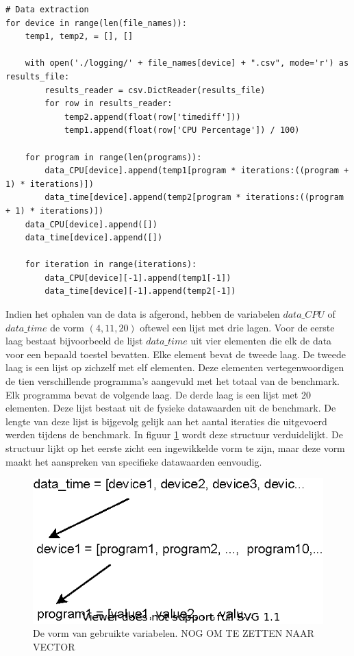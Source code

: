  	\newpage
 
	\begin{lstlisting}[caption={Ophalen data uit bestand voor elk toestel.},captionpos=b, label = {lst:extractiedata}]
# Data extraction
for device in range(len(file_names)):
	temp1, temp2, = [], []
	
	with open('./logging/' + file_names[device] + ".csv", mode='r') as results_file:
		results_reader = csv.DictReader(results_file)
		for row in results_reader:
			temp2.append(float(row['timediff']))
			temp1.append(float(row['CPU Percentage']) / 100)
	
	for program in range(len(programs)):
		data_CPU[device].append(temp1[program * iterations:((program + 1) * iterations)])
		data_time[device].append(temp2[program * iterations:((program + 1) * iterations)])
	data_CPU[device].append([])
	data_time[device].append([])
	
	for iteration in range(iterations):
		data_CPU[device][-1].append(temp1[-1])
		data_time[device][-1].append(temp2[-1])
\end{lstlisting}	
	
	Indien het ophalen van de data is afgerond, hebben de variabelen $data\_CPU$ of $data\_time$ de vorm $(4,11,20)$ oftewel een lijst met drie lagen. Voor de eerste laag bestaat bijvoorbeeld de lijst $data\_time$ uit vier elementen die elk de data voor een bepaald toestel bevatten. Elke element bevat de tweede laag. De tweede laag is een lijst op zichzelf met elf elementen. Deze elementen vertegenwoordigen de tien verschillende programma's aangevuld met het totaal van de benchmark. Elk programma bevat de volgende laag. De derde laag is een lijst met 20 elementen. Deze lijst bestaat uit de fysieke datawaarden uit de benchmark. De lengte van deze lijst is bijgevolg gelijk aan het aantal iteraties die uitgevoerd werden tijdens de benchmark. In figuur \ref{fig:vormvariabele} wordt deze structuur verduidelijkt. De structuur lijkt op het eerste zicht een ingewikkelde vorm te zijn, maar deze vorm maakt het aanspreken van specifieke datawaarden eenvoudig.
				
	\begin{figure}
		\centering
		\includegraphics{afbeeldingen/shapevariable1.eps}
		\caption{De vorm van gebruikte variabelen. NOG OM TE ZETTEN NAAR VECTOR}
		\label{fig:vormvariabele}
	\end{figure}
	
